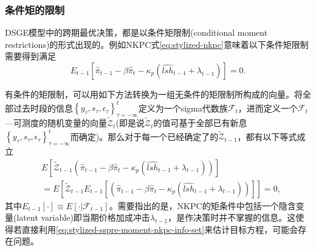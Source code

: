 \subsubsection{条件矩的限制}
\label{sec:stylized-ssrep-restrictions}
DSGE模型中的跨期最优决策，都是以条件矩限制(conditional moment restrictions)的形式出现的。例如NKPC式\eqref{eq:stylized-nkpc}意味着以下条件矩限制需要得到满足
\begin{equation}
  \label{eq:stylized-sspre-moment-nkpc}
  E_{t-1} \left[
  \hat{\pi}_{t-1} - \beta \hat{\pi}_{t} - \kappa_{p}
  \left(
  \widehat{lsh}_{t-1} + \lambda_{t-1}
  \right)
  \right] = 0.
\end{equation}

有条件的矩限制，可以用如下方法转换为一组无条件的矩限制所构成的向量。将全部过去时段的信息$\left\{ y_{\tau}, s_{\tau}, \epsilon_{\tau} \right\}_{\tau = - \infty}^{t}$定义为一个sigma代数族$\mathcal{F}_{t}$，进而定义一个$\mathcal{F}_{t}$—可测度的随机变量的向量$\widetilde{\mathcal{Z}}_{t}$(即是说$\widetilde{\mathcal{Z}}_{t}$的值可基于全部已有新息$\left\{ y_{\tau}, s_{\tau}, \epsilon_{\tau} \right\}_{\tau = - \infty}^{t}$而确定)。那么对于每一个已经确定了的$\widetilde{\mathcal{Z}}_{t-1}$，都有以下等式成立
\begin{equation}
  \label{eq:stylized-sspre-moment-nkpc-info-set}
\begin{split}
  & E \left[
  \widetilde{\mathcal{Z}}_{t-1}
  \left(
  \hat{\pi}_{t-1} - \beta \hat{\pi}_{t} - \kappa_{p}
  \left(
  \widehat{lsh}_{t-1} + \lambda_{t-1}
  \right)
  \right)
  \right] \\
  & = E \left[
  \widetilde{\mathcal{Z}}_{t-1}
  E_{t-1}
  \left[
  \left(
  \hat{\pi}_{t-1} - \beta \hat{\pi}_{t} - \kappa_{p}
  \left(
  \widehat{lsh}_{t-1} + \lambda_{t-1}
  \right)
  \right)
  \right]
  \right] = 0,
\end{split}
\end{equation}
其中$E_{t-1} \left[ \cdot \right] \equiv E \left[ \cdot | \mathcal{F}_{t-1} \right]$。需要指出的是，NKPC的矩条件中包括一个隐含变量(latent variable)即当期价格加成冲击$\lambda_{t-1}$，是作决策时并不掌握的信息。这使得若直接利用\eqref{eq:stylized-sspre-moment-nkpc-info-set}来估计目标方程，可能会存在问题。

